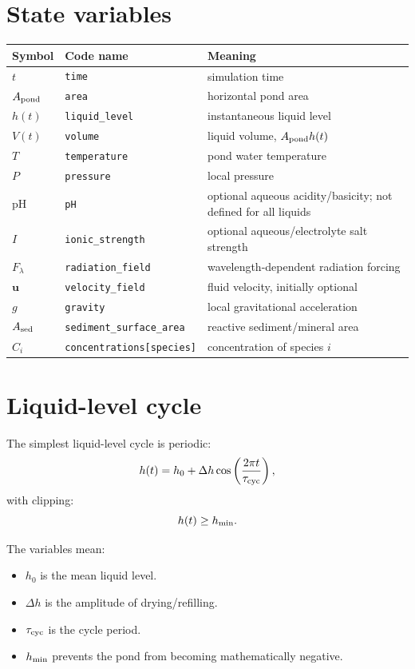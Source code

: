 \documentclass[11pt]{article}
\begin{document}
\section{State variables}

\begin{longtable}{lll}
\toprule
Symbol & Code name & Meaning \\
\midrule
$t$ & \texttt{time} & simulation time \\
$A_{\rm pond}$ & \texttt{area} & horizontal pond area \\
$h(t)$ & \texttt{liquid\_level} & instantaneous liquid level \\
$V(t)$ & \texttt{volume} & liquid volume, $A_{\rm pond}h(t)$ \\
$T$ & \texttt{temperature} & pond water temperature \\
$P$ & \texttt{pressure} & local pressure \\
$\mathrm{pH}$ & \texttt{pH} & optional aqueous acidity/basicity; not defined for all liquids \\
$I$ & \texttt{ionic\_strength} & optional aqueous/electrolyte salt strength \\
$F_{\lambda}$ & \texttt{radiation\_field} & wavelength-dependent radiation forcing \\
$\mathbf{u}$ & \texttt{velocity\_field} & fluid velocity, initially optional \\
$g$ & \texttt{gravity} & local gravitational acceleration \\
$A_{\rm sed}$ & \texttt{sediment\_surface\_area} & reactive sediment/mineral area \\
$C_i$ & \texttt{concentrations[species]} & concentration of species $i$ \\
\bottomrule
\end{longtable}

\section{Liquid-level cycle}

The simplest liquid-level cycle is periodic:
\begin{equation}
h(t)
=
h_0
+
\Delta h
\cos\left(\frac{2\pi t}{\tau_{\rm cyc}}\right),
\end{equation}
with clipping:
\begin{equation}
h(t)\ge h_{\rm min}.
\end{equation}

The variables mean:
\begin{itemize}
  \item $h_0$ is the mean liquid level.
  \item $\Delta h$ is the amplitude of drying/refilling.
  \item $\tau_{\rm cyc}$ is the cycle period.
  \item $h_{\rm min}$ prevents the pond from becoming mathematically negative.
\end{itemize}
\end{document}
